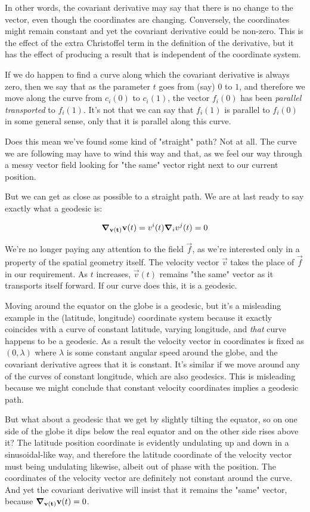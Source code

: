 In other words, the covariant derivative may say that there is no change to the vector, even though the coordinates are changing. Conversely, the coordinates might remain constant and yet the covariant derivative could be non-zero. This is the effect of the extra Christoffel term in the definition of the derivative, but it has the effect of producing a result that is independent of the coordinate system.

If we do happen to find a curve along which the covariant derivative is always zero, then we say that as the parameter $t$ goes from (say) $0$ to $1$, and therefore we move along the curve from $c_i(0)$ to $c_i(1)$, the vector $f_i(0)$ has been \textit{parallel transported} to $f_i(1)$. It's not that we can say that $f_i(1)$ is parallel to $f_i(0)$ in some general sense, only that it is parallel along this curve.

Does this mean we've found some kind of "straight" path? Not at all. The curve we are following may have to wind this way and that, as we feel our way through a messy vector field looking for "the same" vector right next to our current position.

But we can get as close as possible to a straight path. We are at last ready to say exactly what a geodesic is:

$$
\grad_{\mathbf{v(t)}} \mathbf{v}(t)
=
v^i(t) \grad_i v^j(t) = 0
$$

We're no longer paying any attention to the field $\vec{f}$, as we're interested only in a property of the spatial geometry itself. The velocity vector $\vec{v}$ takes the place of $\vec{f}$ in our requirement. As $t$ increases, $\vec{v}(t)$ remains "the same" vector as it transports itself forward. If our curve does this, it is a geodesic.

Moving around the equator on the globe is a geodesic, but it's a misleading example in the (latitude, longitude) coordinate system because it exactly coincides with a curve of constant latitude, varying longitude, and \textit{that} curve happens to be a geodesic. As a result the velocity vector in coordinates is fixed as $(0, \lambda)$ where $\lambda$ is some constant angular speed around the globe, and the covariant derivative agrees that it is constant. It's similar if we move around any of the curves of constant longitude, which are also geodesics. This is misleading because we might conclude that constant velocity coordinates implies a geodesic path.

But what about a geodesic that we get by slightly tilting the equator, so on one side of the globe it dips below the real equator and on the other side rises above it? The latitude position coordinate is evidently undulating up and down in a sinusoidal-like way, and therefore the latitude coordinate of the velocity vector must being undulating likewise, albeit out of phase with the position. The coordinates of the velocity vector are definitely not constant around the curve. And yet the covariant derivative will insist that it remains the "same" vector, because $\grad_{\mathbf{v(t)}} \mathbf{v}(t) = 0$.

